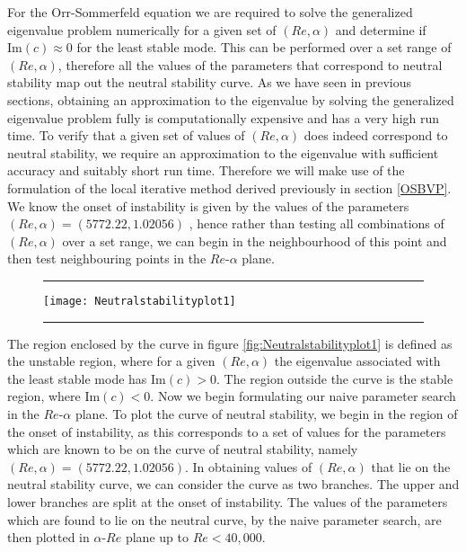 \documentclass[a4paper, 12pt, twoside, openright]{article}
\numberwithin{equation}{section}
\begin{document}
For the Orr-Sommerfeld equation we are required to solve the generalized eigenvalue problem numerically for a given set of $(Re,\alpha)$ and determine if $\mathrm{Im}(c)\approx 0$ for the least stable mode. This can be performed over a set range of $(Re,\alpha)$, therefore all the values of the parameters that correspond to neutral stability map out the neutral stability curve. As we have seen in previous sections, obtaining an approximation to the eigenvalue by solving the generalized eigenvalue problem fully is computationally expensive and has a very high run time. To verify that a given set of values of $(Re,\alpha)$ does indeed correspond to neutral stability, we require an approximation to the eigenvalue with sufficient accuracy and suitably short run time. Therefore we will make use of the formulation of the local iterative method derived previously in section \ref{OSBVP}. We know the onset of instability is given by the values of the parameters $(Re,\alpha)= (5772.22,1.02056)$ \citep{Orszag71}, hence rather than testing all combinations of $(Re,\alpha)$ over a set range, we can begin in the neighbourhood of this point and then test neighbouring points in the $Re$-$\alpha$ plane. %

\begin{figure}[h]
\centering
\rule{\linewidth}{1.5pt}
\texttt{[image: Neutralstabilityplot1]} 
\rule{\linewidth}{1.5pt}
\end{figure}

The region enclosed by the curve in figure \ref{fig:Neutralstabilityplot1} is defined as the unstable region, where for a given $(Re,\alpha)$ the eigenvalue associated with the least stable mode has $\mathrm{Im}(c)>0$. The region outside the curve is the stable region, where $\mathrm{Im}(c)<0$. Now we begin formulating our naive parameter search in the $Re$-$\alpha$ plane. To plot the curve of neutral stability, we begin in the region of the onset of instability, as this corresponds to a set of values for the parameters which are known to be on the curve of neutral stability, namely $(Re,\alpha)=(5772.22,1.02056)$. In obtaining values of $(Re,\alpha)$ that lie on the neutral stability curve, we can consider the curve as two branches. The upper and lower branches are split at the onset of instability. The values of the parameters which are found to lie on the neutral curve, by the naive parameter search, are then plotted in $\alpha$-$Re$ plane up to $Re<40,000$. %
\end{document}
